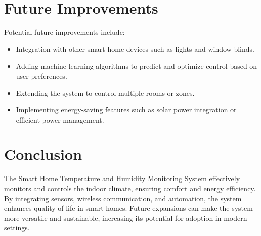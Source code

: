 \documentclass[a4paper,12pt]{article}
\begin{document}
\section{Future Improvements}
Potential future improvements include:
\begin{itemize}
    \item Integration with other smart home devices such as lights and window blinds.
    \item Adding machine learning algorithms to predict and optimize control based on user preferences.
    \item Extending the system to control multiple rooms or zones.
    \item Implementing energy-saving features such as solar power integration or efficient power management.
\end{itemize}

\section{Conclusion}
The Smart Home Temperature and Humidity Monitoring System effectively monitors and controls the indoor climate, ensuring comfort and energy efficiency. By integrating sensors, wireless communication, and automation, the system enhances quality of life in smart homes. Future expansions can make the system more versatile and sustainable, increasing its potential for adoption in modern settings.
\end{document}
